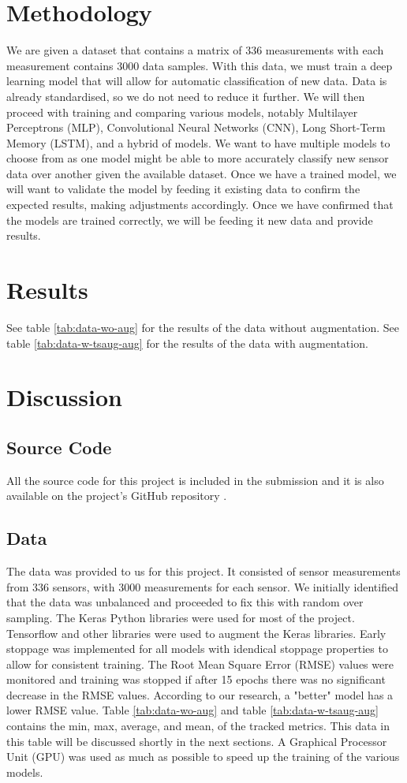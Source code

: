\documentclass[conference]{IEEEtran}
\begin{document}
\section{Methodology}
We are given a dataset that contains a matrix of 336 measurements with each measurement contains 3000 data samples. With this data, we must train a deep learning model that will allow for automatic classification of new data. Data is already standardised, so we do not need to reduce it further. We will then proceed with training and comparing various models, notably Multilayer Perceptrons (MLP), Convolutional Neural Networks (CNN), Long Short-Term Memory (LSTM), and a hybrid of models. We want to have multiple models to choose from as one model might be able to more accurately classify new sensor data over another given the available dataset. Once we have a trained model, we will want to validate the model by feeding it existing data to confirm the expected results, making adjustments accordingly. Once we have confirmed that the models are trained correctly, we will be feeding it new data and provide results.
\section{Results}
See table \ref{tab:data-wo-aug} for the results of the data without augmentation. See table \ref{tab:data-w-tsaug-aug} for the results of the data with augmentation.
\section{Discussion}
\subsection{Source Code}
All the source code for this project is included in the submission and it is also available on the project's GitHub repository \cite{github}.
\subsection{Data}
The data was provided to us for this project. It consisted of sensor measurements from 336 sensors, with 3000 measurements for each sensor. We initially identified that the data was unbalanced and proceeded to fix this with random over sampling. The Keras Python libraries \cite{keras} were used for most of the project. Tensorflow and other libraries were used to augment the Keras libraries. Early stoppage was implemented for all models with idendical stoppage properties to allow for consistent training. The Root Mean Square Error (RMSE) values were monitored and training was stopped if after 15 epochs there was no significant decrease in the RMSE values. According to our research, a "better" model has a lower RMSE value. Table \ref{tab:data-wo-aug} and table \ref{tab:data-w-tsaug-aug} contains the min, max, average, and mean, of the tracked metrics. This data in this table will be discussed shortly in the next sections. A Graphical Processor Unit (GPU) was used as much as possible to speed up the training of the various models.
\end{document}
